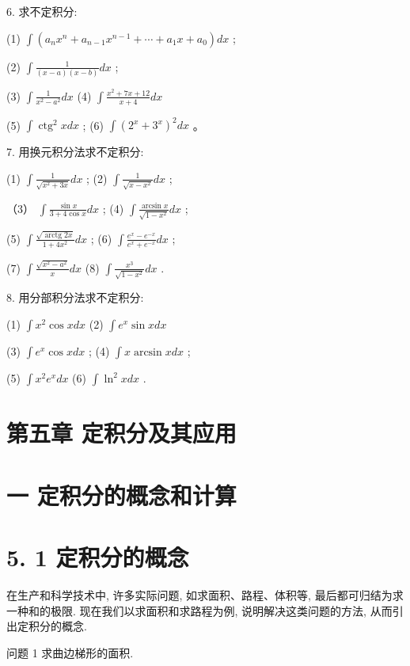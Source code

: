 \documentclass[10pt]{article}
\begin{document}
6. 求不定积分:

(1) \(\int \left( {{a}_{n}{x}^{n} + {a}_{n - 1}{x}^{n - 1} + \cdots + {a}_{1}x + {a}_{0}}\right) {dx}\) ;

(2) \(\int \frac{1}{\left( {x - a}\right) \left( {x - b}\right) }{dx}\) ;

(3) \(\int \frac{1}{{x}^{2} - {a}^{2}}{dx}\) (4) \(\int \frac{{x}^{2} + {7x} + {12}}{x + 4}{dx}\)

(5) \(\int {\operatorname{ctg}}^{2}{xdx}\) ; (6) \(\int {\left( {2}^{x} + {3}^{x}\right) }^{2}{dx}\) 。

7. 用换元积分法求不定积分:

(1) \(\int \frac{1}{\sqrt{{x}^{2} + {3x}}}{dx}\) ; (2) \(\int \frac{1}{\sqrt{x - {x}^{2}}}{dx}\) ;

（3） \(\int \frac{\sin x}{3 + 4\cos x}{dx}\) ; (4) \(\int \frac{\arcsin x}{\sqrt{1 - {x}^{2}}}{dx}\) ;

(5) \(\int \frac{\sqrt{\operatorname{arctg}{2x}}}{1 + 4{x}^{2}}{dx}\) ; (6) \(\int \frac{{e}^{x} - {e}^{-x}}{{e}^{x} + {e}^{-x}}{dx}\) ;

(7) \(\int \frac{\sqrt{{x}^{2} - {a}^{2}}}{x}{dx}\) (8) \(\int \frac{{x}^{3}}{\sqrt{1 - {x}^{2}}}{dx}\) .

8. 用分部积分法求不定积分:

(1) \(\int {x}^{2}\cos {xdx}\) (2) \(\int {e}^{x}\sin {xdx}\)

(3) \(\int {e}^{x}\cos {xdx}\) ; (4) \(\int x\arcsin {xdx}\) ;

(5) \(\int {x}^{2}{e}^{x}{dx}\) (6) \(\int {\ln }^{2}{xdx}\) .

\section*{第五章 定积分及其应用}

\section*{一 定积分的概念和计算}

\section*{5. 1 定积分的概念}

在生产和科学技术中, 许多实际问题, 如求面积、路程、体积等, 最后都可归结为求一种和的极限. 现在我们以求面积和求路程为例, 说明解决这类问题的方法, 从而引出定积分的概念.

问题 1 求曲边梯形的面积.
\end{document}
